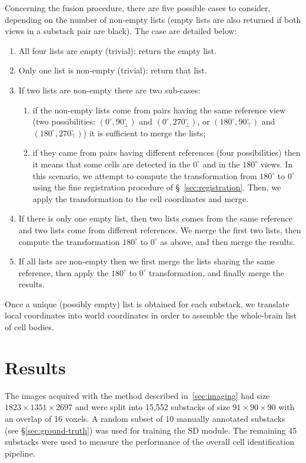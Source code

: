 \documentclass[smallextended]{svjour3}       %
\begin{document}
Concerning the fusion procedure, there are five possible cases to
consider, depending on the number of non-empty lists (empty lists are also
returned if both views in a substack pair are black). The case are
detailed below:
\begin{enumerate}
\item All four lists are empty (trivial): return the empty list.
\item Only one list is non-empty (trivial): return that list.
\item If two lists are non-empty there are two sub-cases:
  \begin{enumerate}
  \item if the non-empty lists come from pairs having the same
    reference view (two possibilities: $(0^\circ,90^\circ_\perp)$ and
    $(0^\circ,270^\circ_\perp)$, or $(180^\circ,90^\circ_\top)$ and
    $(180^\circ,270^\circ_\top)$) it is sufficient to merge the
    lists;
  \item if they came from pairs having different references (four
    possibilities) then it means that some cells are detected in the
    $0^\circ$ and in the $180^\circ$ views. In this scenario, we
    attempt to compute the transformation from $180^\circ$ to
    $0^\circ$ using the fine registration procedure of
    \S~\ref{sec:registration}. Then, we apply the transformation to the cell coordinates and merge.
  \end{enumerate}
\item If there is only one empty list, then two lists comes from the
  same reference and two lists come from different references. We
  merge the first two lists, then compute the transformation
  $180^\circ$ to $0^\circ$ as above, and then merge the results.
\item If all lists are non-empty then we first merge the lists sharing
  the same reference, then apply the $180^\circ$ to $0^\circ$
  transformation, and finally merge the results.
\end{enumerate}
Once a unique (possibly empty) list is obtained for each substack, we
translate local coordinates into world coordinates in order to assemble the
whole-brain list of cell bodies.

\section{Results}

The images acquired with the method described in~\ref{sec:imaging} had
size $1823\times 1351 \times 2697$ and were split into 15,552 substacks
of size $91\times 90\times 90$ with an overlap of 16 voxels.  A random
subset of 10 manually annotated substacks (see \S\ref{sec:ground-truth})
was used for training the SD module. The remaining 45 substacks were
used to measure the performance of the overall cell identification
pipeline.
\end{document}
